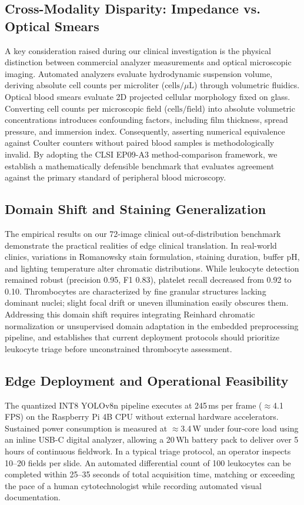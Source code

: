 \documentclass[10pt,conference]{IEEEtran}
\begin{document}
\subsection{Cross-Modality Disparity: Impedance vs. Optical Smears}
A key consideration raised during our clinical investigation is the physical distinction between commercial analyzer measurements and optical microscopic imaging. Automated analyzers evaluate hydrodynamic suspension volume, deriving absolute cell counts per microliter ($\text{cells}/\mu\text{L}$) through volumetric fluidics. Optical blood smears evaluate 2D projected cellular morphology fixed on glass. Converting cell counts per microscopic field ($\text{cells}/\text{field}$) into absolute volumetric concentrations introduces confounding factors, including film thickness, spread pressure, and immersion index. Consequently, asserting numerical equivalence against Coulter counters without paired blood samples is methodologically invalid. By adopting the CLSI EP09-A3 method-comparison framework, we establish a mathematically defensible benchmark that evaluates agreement against the primary standard of peripheral blood microscopy.

\subsection{Domain Shift and Staining Generalization}
The empirical results on our 72-image clinical out-of-distribution benchmark demonstrate the practical realities of edge clinical translation. In real-world clinics, variations in Romanowsky stain formulation, staining duration, buffer pH, and lighting temperature alter chromatic distributions. While leukocyte detection remained robust (precision 0.95, F1 0.83), platelet recall decreased from 0.92 to 0.10. Thrombocytes are characterized by fine granular structures lacking dominant nuclei; slight focal drift or uneven illumination easily obscures them. Addressing this domain shift requires integrating Reinhard chromatic normalization or unsupervised domain adaptation in the embedded preprocessing pipeline, and establishes that current deployment protocols should prioritize leukocyte triage before unconstrained thrombocyte assessment.

\subsection{Edge Deployment and Operational Feasibility}
The quantized INT8 YOLOv8n pipeline executes at 245\,ms per frame ($\approx$4.1\,FPS) on the Raspberry Pi 4B CPU without external hardware accelerators. Sustained power consumption is measured at $\approx$3.4\,W under four-core load using an inline USB-C digital analyzer, allowing a 20\,Wh battery pack to deliver over 5 hours of continuous fieldwork. In a typical triage protocol, an operator inspects 10–20 fields per slide. An automated differential count of 100 leukocytes can be completed within 25–35 seconds of total acquisition time, matching or exceeding the pace of a human cytotechnologist while recording automated visual documentation.
\end{document}
